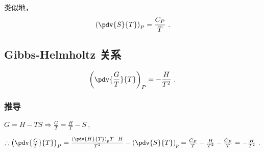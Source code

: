 类似地，
\begin{equation}
\left(\pdv{S}{T}\right)_P=\frac{C_P}{T}~.
\end{equation}

\subsection{Gibbs-Helmholtz 关系}
\begin{equation}
\left(\pdv{\frac{G}{T}}{T}\right)_P=-\frac{H}{T^2}~.
\end{equation}

\subsubsection{推导}
$G=H-TS \Rightarrow \frac{G}{T} = \frac{H}{T} - S~,$

$\therefore \left(\pdv{\frac{G}{T}}{T}\right)_P=\frac{\left(\pdv{H}{T}\right)_pT-H}{T^2} - \left(\pdv{S}{T}\right)_p = \frac{C_P}{T} - \frac{H}{T^2} - \frac{C_P}{T} = - \frac{H}{T^2}~.$

